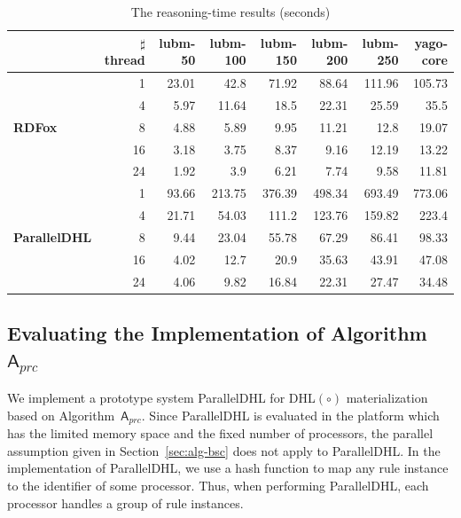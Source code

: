 \begin{table}
\centering
\caption{The reasoning-time results (seconds)}
\begin{tabular}{|l|r|r|r|r|r|r|r|}
\hline
&\small$\sharp$thread&lubm-50&lubm-100&lubm-150&lubm-200&lubm-250&yago-core\\
\hline
\multirow{5}{*}{ \textbf{RDFox}}&1&23.01&42.8&71.92&88.64&111.96&105.73\\
                    &4&5.97&11.64&18.5&22.31&25.59&35.5\\
                    &8&4.88&5.89&9.95&11.21&12.8&19.07\\
                    &16&3.18&3.75&8.37&9.16&12.19&13.22\\
                    &24&1.92&3.9&6.21&7.74&9.58&11.81\\
\hline
\multirow{5}{*}{ \small{\textbf{ParallelDHL}}}&1&93.66&213.75&376.39&498.34&693.49&773.06\\
                    &4&21.71&54.03&111.2&123.76&159.82&223.4\\
                    &8&9.44&23.04&55.78&67.29&86.41&98.33\\
                    &16&4.02&12.7&20.9&35.63&43.91&47.08\\
                    &24&4.06&9.82&16.84&22.31&27.47&34.48\\
\hline
\end{tabular}
\label{tab:result}
\end{table}


\subsection{Evaluating the Implementation of Algorithm~$\mathsf{A}_{prc}$}

We implement a prototype system ParallelDHL for DHL$(\circ)$ materialization
based on Algorithm~$\mathsf{A}_{prc}$. Since ParallelDHL is evaluated in the
platform which has the limited memory space and the fixed number of processors,
the parallel assumption given in Section~\ref{sec:alg-bsc} does not apply to ParallelDHL.
In the implementation of ParallelDHL, we use a hash function to map any rule instance
to the identifier of some processor. Thus, when performing ParallelDHL,
each processor handles a group of rule instances.

